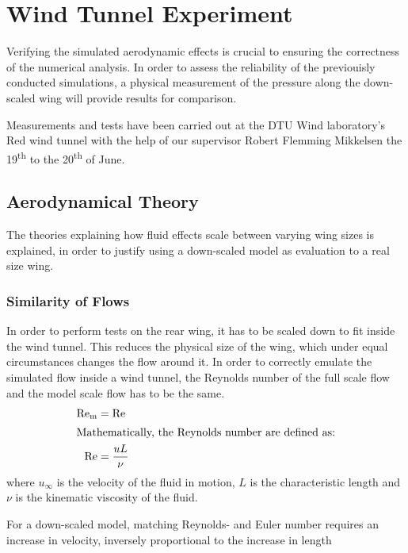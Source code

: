 \chapter{Wind Tunnel Experiment}
\label{chapexperiments}
  Verifying the simulated aerodynamic effects is crucial to ensuring the correctness of the numerical analysis. In order to assess the reliability of the previouisly conducted simulations, a physical measurement of the pressure along the down-scaled wing will provide results for comparison. 

  Measurements and tests have been carried out at the DTU Wind laboratory's Red wind tunnel with the help of our supervisor Robert Flemming Mikkelsen the 19\textsuperscript{th} to the 20\textsuperscript{th} of June.

\section{Aerodynamical Theory}

  The theories explaining how fluid effects scale between varying wing sizes is explained, in order to justify using a down-scaled model as evaluation to a real size wing.

  \subsection{Similarity of Flows}
  \label{sec:similarflows}

    In order to perform tests on the rear wing, it has to be scaled down to fit inside the wind tunnel. This reduces the physical size of the wing, which under equal circumstances changes the flow around it. In order to correctly emulate the simulated flow inside a wind tunnel, the Reynolds number of the full scale flow and the model scale flow has to be the same.
    \begin{align}
      \text{Re}_\text{m} &= \text{Re}\\
      \intertext{Mathematically, the Reynolds number are defined as:}
      \text{Re} &= \frac{u L}{\nu}
    \end{align}
    where $u_\infty$ is the velocity of the fluid in motion, $L$ is the characteristic length and $\nu$ is the kinematic viscosity of the fluid.

    For a down-scaled model, matching Reynolds- and Euler number requires an increase in velocity, inversely proportional to the increase in length 

